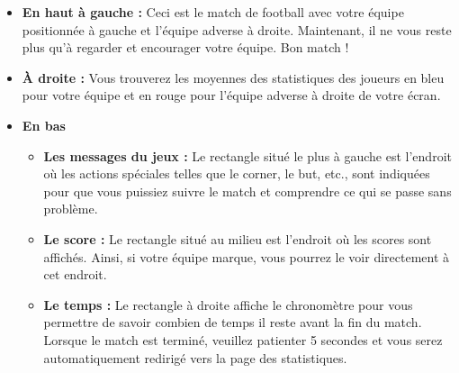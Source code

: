 \begin{itemize}
    \item \textbf{En haut à gauche :} 
        Ceci est le match de football avec votre équipe positionnée à gauche et l'équipe adverse à droite. Maintenant, il ne vous reste plus qu'à regarder et encourager votre équipe. Bon match !

    \vspace{15pt}

    \item \textbf{À droite :} 
         Vous trouverez les moyennes des statistiques des joueurs en bleu pour votre équipe et en rouge pour l'équipe adverse à droite de votre écran.

    \vspace{15pt}

    \item \textbf{En bas} 
        \begin{itemize}
            
            \item \textbf{Les messages du jeux :}
                Le rectangle situé le plus à gauche est l'endroit où les actions spéciales telles que le corner, le but, etc., sont indiquées pour que vous puissiez suivre le match et comprendre ce qui se passe sans problème.
            
            \vspace{15pt}
            
            \item \textbf{Le score :}
                Le rectangle situé au milieu est l'endroit où les scores sont affichés. Ainsi, si votre équipe marque, vous pourrez le voir directement à cet endroit.

            \vspace{15pt}
            
            \item \textbf{Le temps :}
                Le rectangle à droite affiche le chronomètre pour vous permettre de savoir combien de temps il reste avant la fin du match. Lorsque le match est terminé, veuillez patienter 5 secondes et vous serez automatiquement redirigé vers la page des statistiques.
            
            \vspace{15pt}
        \end{itemize}

        
    \vspace{15pt}
\end{itemize}




